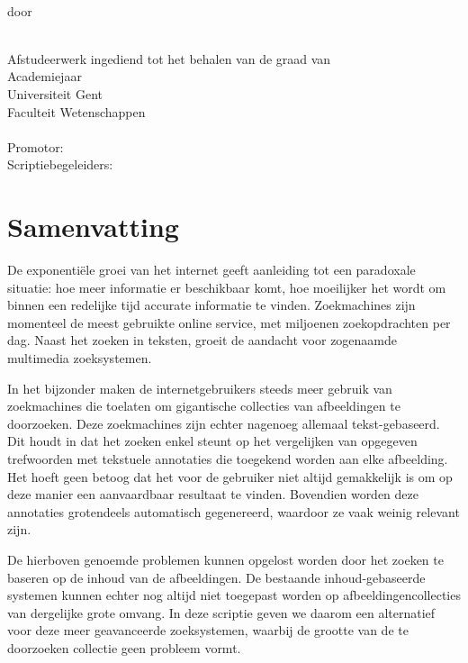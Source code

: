 \newpage
\thispagestyle{plain}

\begin{center}
{\sf\huge \titel }\\[3mm]
door\\
{\Large\auteur{}} \\
\end{center}
\noindent Afstudeerwerk ingediend tot het behalen van de graad van
\richting
\vspace{3mm}\\
Academiejaar \jaar
\vspace{3mm}\\
\noindent Universiteit Gent\\
Faculteit Wetenschappen\\
\vspace{3mm}\\
\noindent Promotor: \promotor\\
\noindent Scriptiebegeleiders: \begeleider\\
\vfill

\section*{Samenvatting}
De exponenti\"ele groei van het internet geeft aanleiding tot een paradoxale
situatie: hoe meer informatie er beschikbaar komt, hoe moeilijker het wordt
om binnen een redelijke tijd accurate informatie te vinden. Zoekmachines zijn momenteel
de meest gebruikte online service, met miljoenen zoekopdrachten per dag. Naast het zoeken
in teksten, groeit de aandacht voor zogenaamde multimedia zoeksystemen. 

In het bijzonder maken de internetgebruikers steeds meer gebruik van zoekmachines die toelaten om 
gigantische collecties van afbeeldingen te doorzoeken. Deze zoekmachines zijn echter nagenoeg 
allemaal tekst-gebaseerd. Dit houdt in dat het zoeken enkel steunt op het vergelijken van opgegeven 
trefwoorden met tekstuele annotaties die toegekend worden aan elke afbeelding. Het hoeft geen
betoog dat het voor de gebruiker niet altijd gemakkelijk is om op deze manier een aanvaardbaar 
resultaat te vinden. Bovendien worden deze annotaties grotendeels automatisch gegenereerd, 
waardoor ze vaak weinig relevant zijn.

De hierboven genoemde problemen kunnen opgelost worden door het zoeken te baseren op de inhoud 
van de afbeeldingen. De bestaande inhoud-gebaseerde systemen kunnen echter nog altijd niet 
toegepast worden op afbeeldingencollecties van dergelijke grote omvang. In deze scriptie geven 
we daarom een alternatief voor deze meer geavanceerde zoeksystemen, waarbij de grootte van 
de te doorzoeken collectie geen probleem vormt. 

